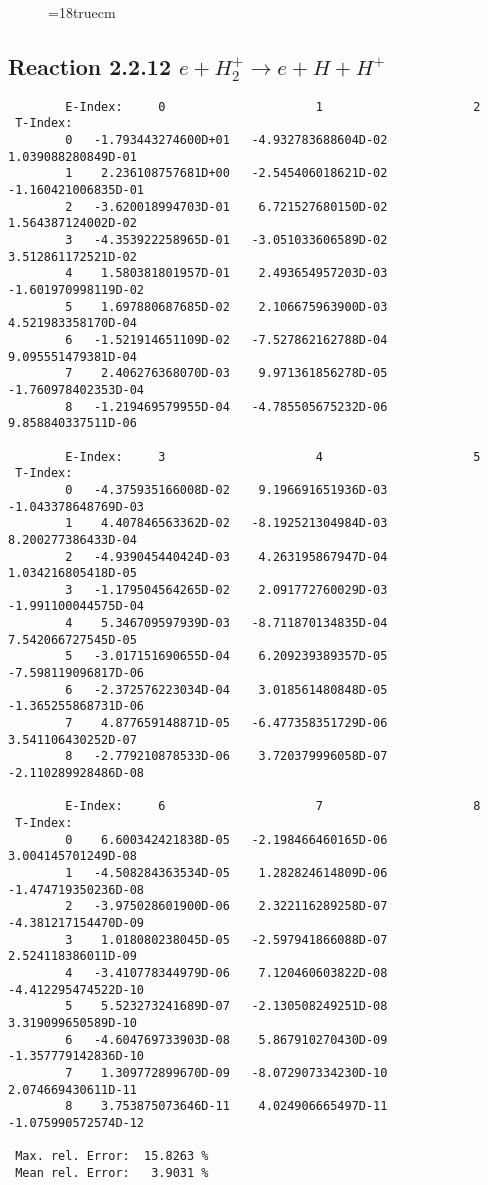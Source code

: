 \begin{figure} \label{2.2.11}
\epsfxsize=18truecm
\end{figure}
\newpage




\subsection{
Reaction 2.2.12 $  e + H_2^+   \rightarrow  e + H + H^+  $
}



\begin{verbatim}
        E-Index:     0                     1                     2
 T-Index:
        0   -1.793443274600D+01   -4.932783688604D-02    1.039088280849D-01
        1    2.236108757681D+00   -2.545406018621D-02   -1.160421006835D-01
        2   -3.620018994703D-01    6.721527680150D-02    1.564387124002D-02
        3   -4.353922258965D-01   -3.051033606589D-02    3.512861172521D-02
        4    1.580381801957D-01    2.493654957203D-03   -1.601970998119D-02
        5    1.697880687685D-02    2.106675963900D-03    4.521983358170D-04
        6   -1.521914651109D-02   -7.527862162788D-04    9.095551479381D-04
        7    2.406276368070D-03    9.971361856278D-05   -1.760978402353D-04
        8   -1.219469579955D-04   -4.785505675232D-06    9.858840337511D-06

        E-Index:     3                     4                     5
 T-Index:
        0   -4.375935166008D-02    9.196691651936D-03   -1.043378648769D-03
        1    4.407846563362D-02   -8.192521304984D-03    8.200277386433D-04
        2   -4.939045440424D-03    4.263195867947D-04    1.034216805418D-05
        3   -1.179504564265D-02    2.091772760029D-03   -1.991100044575D-04
        4    5.346709597939D-03   -8.711870134835D-04    7.542066727545D-05
        5   -3.017151690655D-04    6.209239389357D-05   -7.598119096817D-06
        6   -2.372576223034D-04    3.018561480848D-05   -1.365255868731D-06
        7    4.877659148871D-05   -6.477358351729D-06    3.541106430252D-07
        8   -2.779210878533D-06    3.720379996058D-07   -2.110289928486D-08

        E-Index:     6                     7                     8
 T-Index:
        0    6.600342421838D-05   -2.198466460165D-06    3.004145701249D-08
        1   -4.508284363534D-05    1.282824614809D-06   -1.474719350236D-08
        2   -3.975028601900D-06    2.322116289258D-07   -4.381217154470D-09
        3    1.018080238045D-05   -2.597941866088D-07    2.524118386011D-09
        4   -3.410778344979D-06    7.120460603822D-08   -4.412295474522D-10
        5    5.523273241689D-07   -2.130508249251D-08    3.319099650589D-10
        6   -4.604769733903D-08    5.867910270430D-09   -1.357779142836D-10
        7    1.309772899670D-09   -8.072907334230D-10    2.074669430611D-11
        8    3.753875073646D-11    4.024906665497D-11   -1.075990572574D-12

 Max. rel. Error:  15.8263 %
 Mean rel. Error:   3.9031 %

\end{verbatim}
